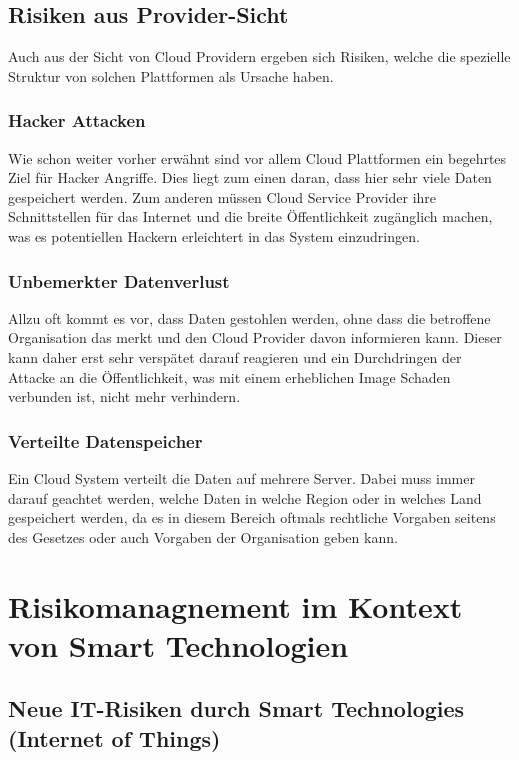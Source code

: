 \documentclass{report}
\begin{document}
\section{Risiken aus Provider-Sicht}
Auch aus der Sicht von Cloud Providern ergeben sich Risiken, welche die spezielle Struktur von solchen Plattformen als Ursache haben.

\subsection{Hacker Attacken}
Wie schon weiter vorher erwähnt sind vor allem Cloud Plattformen ein begehrtes Ziel für Hacker Angriffe. Dies liegt zum einen daran, dass hier sehr viele Daten gespeichert werden. Zum anderen müssen Cloud Service Provider ihre Schnittstellen für das Internet und die breite Öffentlichkeit zugänglich machen, was es potentiellen Hackern erleichtert in das System einzudringen. \cite{mos2011}

\subsection{Unbemerkter Datenverlust}
Allzu oft kommt es vor, dass Daten gestohlen werden, ohne dass die betroffene Organisation das merkt und den Cloud Provider davon informieren kann. Dieser kann daher erst sehr verspätet darauf reagieren und ein Durchdringen der Attacke an die Öffentlichkeit, was mit einem erheblichen Image Schaden verbunden ist, nicht mehr verhindern.\cite{mos2011}

\subsection{Verteilte Datenspeicher}
Ein Cloud System verteilt die Daten auf mehrere Server. Dabei muss immer darauf geachtet werden, welche Daten in welche Region oder in welches Land gespeichert werden, da es in diesem Bereich oftmals rechtliche Vorgaben seitens des Gesetzes oder auch Vorgaben der Organisation geben kann. \cite{mos2011}





\chapter{Risikomanagnement im Kontext von Smart Technologien}
\label{sect:relevance}

\section{Neue IT-Risiken durch Smart Technologies (Internet of Things)}
\end{document}
